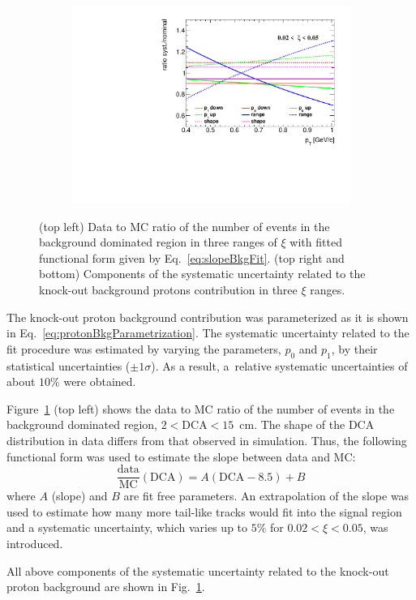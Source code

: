 \begin{figure}[h!]
\begin{subfigure}{.49\textwidth}
 	\end{subfigure}
 	\begin{subfigure}{.49\textwidth}
 		\includegraphics[width=\textwidth,page=3]{chapters/chrgSTAR/img/DCAproton/p_bkg.pdf}
 	\end{subfigure}
 	\caption{(top left) Data to MC ratio of  the  number of events in the background dominated region in three ranges of $\xi$ with fitted functional form given by Eq.~\eqref{eq:slopeBkgFit}. (top right and bottom) Components of the systematic uncertainty related to the  knock-out background protons contribution in three $\xi$ ranges. }
 	\label{fig:protonBkgSyst}
 \end{figure}

The  knock-out proton background contribution was  parameterized as  it is shown in  Eq.~\eqref{eq:protonBkgParametrization}. The systematic uncertainty related to the fit procedure was estimated by varying the   parameters, $p_0$ and $p_1$, by their statistical uncertainties ($\pm1\sigma$).  As a result, a~relative systematic uncertainties of about $10\%$ were obtained.


 
 Figure~\ref{fig:protonBkgSyst} (top left) shows the data to MC ratio of  the  number of events in the background dominated region, $2<\textrm{DCA}<15$~cm. The shape of the $\textrm{DCA}$ distribution in data  differs from that observed in simulation. Thus, the following functional form was used to estimate the slope between data and MC:
\begin{equation}
\frac{\textrm{data}}{\textrm{MC}}\left(\textrm{DCA}\right) = A(\textrm{DCA}-8.5)+B
\label{eq:slopeBkgFit}
\end{equation}
where $A$ (slope) and  $B$ are fit free parameters. An extrapolation of the slope was used to estimate how many
more tail-like tracks would fit into the signal region and a systematic uncertainty, which varies up to $5\%$ for $0.02< \xi<0.05$, was introduced. 




All above components of the systematic uncertainty related to the knock-out proton background are shown in Fig.~\ref{fig:protonBkgSyst}.
 
 
 


 
  \FloatBarrier